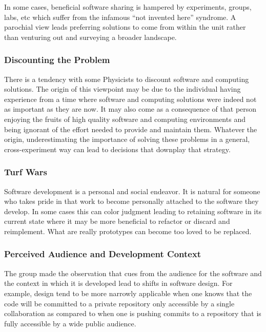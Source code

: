 In some cases, beneficial software sharing is hampered by experiments,
groups, labs, etc which suffer from the infamous ``not invented here''
syndrome.  A parochial view leads preferring solutions to come from
within the unit rather than venturing out and surveying a broader
landscape.

\subsubsection{Discounting the Problem}

There is a tendency with some Physicists to discount software and
computing solutions.  The origin of this viewpoint may be due to the
individual having experience from a time where software and computing
solutions were indeed not as important as they are now.  It may also
come as a consequence of that person enjoying the fruits of high
quality software and computing environments and being ignorant of the
effort needed to provide and maintain them.  Whatever the origin,
underestimating the importance of solving these problems in a general,
cross-experiment way can lead to decisions that downplay that
strategy.

\subsubsection{Turf Wars}

Software development is a personal and social endeavor.  It is natural
for someone who takes pride in that work to become personally attached
to the software they develop.  In some cases this can color judgment
leading to retaining software in its current state where it may be
more beneficial to refactor or discard and reimplement.  What are
really prototypes can become too loved to be replaced.

\subsubsection{Perceived Audience and Development Context}

The group made the observation that cues from the audience for the
software and the context in which it is developed lead to shifts in
software design.  For example, design tend to be more narrowly
applicable when one knows that the code will be committed to a private
repository only accessible by a single collaboration as compared to
when one is pushing commits to a repository that is fully accessible
by a wide public audience.

